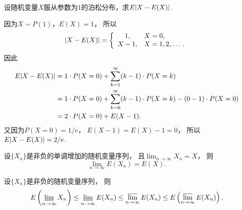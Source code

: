 \begin{example}
设随机变量\(X\)服从参数为1的泊松分布，求\(E\abs{X-E(X)}\).
\begin{solution}
因为\(X \sim P(1)\)，\(E(X) = 1\)，
所以\begin{equation*}
	\abs{X-E(X)} = \left\{ \begin{array}{cl}
		1, & X=0, \\
		X - 1, & X=1,2,\dotsc.
	\end{array} \right.
\end{equation*}
因此\begin{align*}
	E\abs{X-E(X)}
	&= 1 \cdot P(X=0)
	+ \sum_{k=1}^\infty (k-1) \cdot P(X=k) \\
	&= 1 \cdot P(X=0)
	+ \sum_{k=0}^\infty (k-1) \cdot P(X=k)
	- (0-1) \cdot P(X=0) \\
	&= 2 \cdot P(X=0)
	+ E(X-1).
\end{align*}
又因为\(P(X=0)=1/e\)，
\(E(X-1) = E(X) - 1 = 0\)，
所以\(E\abs{X-E(X)} = 2/e\).
\end{solution}
\end{example}

\begin{property}%
设\(\{X_n\}\)是非负的单调增加的随机变量序列，
且\(\lim_{n\to\infty} X_n = X\)，
则\begin{equation*}
	\lim_{n\to\infty} E(X_n) = E(X).
\end{equation*}
\end{property}

\begin{property}%
设\(\{X_n\}\)是非负的随机变量序列，
则\begin{equation*}
	E\left( \varliminf_{n\to\infty} X_n \right)
	\leq \varliminf_{n\to\infty} E(X_n)
	\leq \varlimsup_{n\to\infty} E(X_n)
	\leq E\left( \varlimsup_{n\to\infty} E(X_n) \right).
\end{equation*}
\end{property}
